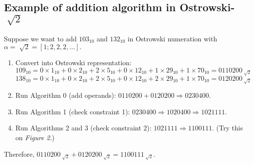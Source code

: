 \documentclass[landscape]{sciposter}
\begin{document}
\begin{multicols}{3}

\begin{mdframed}[style=MyFrame]
\subsection*{Example of addition algorithm in Ostrowski-$\sqrt[~]{2}$}
\end{mdframed}
\begin{minipage}{\columnwidth}

Suppose we want to add $103_{10}$ and $132_{10}$ in Ostrowski numeration with $\alpha = \sqrt[~]{2}= [1; 2,2,2,\dots].$
\begin{enumerate}
\item Convert into Ostrowski representation:\\
$109_{10} = 0\times1_{10}+0\times2_{10}+2\times5_{10}+0\times12_{10}+1\times29_{10}+1\times70_{10}= 0110200_{\sqrt[]{2}}$
\\
$138_{10} = 0\times1_{10}+0\times2_{10}+2\times5_{10}+0\times12_{10}+2\times29_{10}+1\times70_{10} = 0120200_{\sqrt[]{2}}$
\item Run Algorithm 0 (add operands): $0110200 + 0120200 \Rightarrow 0230400$.
\item Run Algorithm 1 (check constraint 1): $0230400 \Rightarrow 1020400 \Rightarrow 1021111$.
\item Run Algorithms 2 and 3 (check constraint 2): $1021111 \Rightarrow 1100111$. (Try this on \emph{Figure 2}.)
\end{enumerate}
Therefore, $0110200_{\sqrt[]{2}}+0120200_{\sqrt[]{2}}=1100111_{\sqrt[]{2}}$.\\


\end{minipage}

\columnbreak


\end{multicols}
\end{document}
